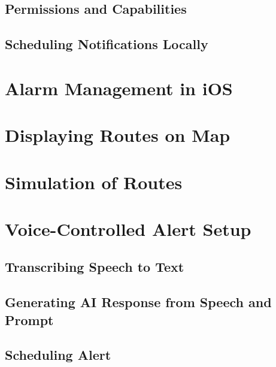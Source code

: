 \subsection{Permissions and Capabilities}
\subsection{Scheduling Notifications Locally}

\section{Alarm Management in iOS}

\section{Displaying Routes on Map}

\section{Simulation of Routes}

\section{Voice-Controlled Alert Setup}
\subsection{Transcribing Speech to Text}
\subsection{Generating AI Response from Speech and Prompt}
\subsection{Scheduling Alert}
